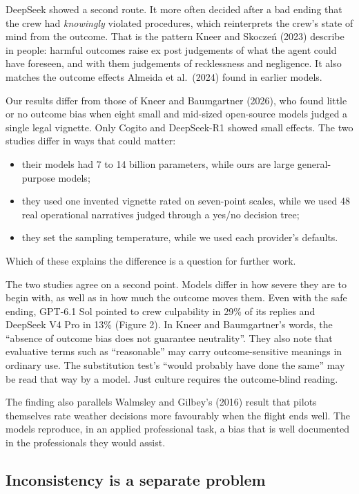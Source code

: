 \documentclass[11pt]{article}
\providecommand{\tightlist}{\setlength{\itemsep}{0pt}\setlength{\parskip}{0pt}}
\begin{document}
DeepSeek showed a second route. It more often decided after a bad ending that the crew had \emph{knowingly} violated procedures, which reinterprets the crew's state of mind from the outcome. That is the pattern Kneer and Skoczeń (2023) describe in people: harmful outcomes raise ex post judgements of what the agent could have foreseen, and with them judgements of recklessness and negligence. It also matches the outcome effects Almeida et al.~(2024) found in earlier models.

Our results differ from those of Kneer and Baumgartner (2026), who found little or no outcome bias when eight small and mid-sized open-source models judged a single legal vignette. Only Cogito and DeepSeek-R1 showed small effects. The two studies differ in ways that could matter:

\begin{itemize}
\tightlist
\item
  their models had 7 to 14 billion parameters, while ours are large general-purpose models;
\item
  they used one invented vignette rated on seven-point scales, while we used 48 real operational narratives judged through a yes/no decision tree;
\item
  they set the sampling temperature, while we used each provider's defaults.
\end{itemize}

Which of these explains the difference is a question for further work.

The two studies agree on a second point. Models differ in how severe they are to begin with, as well as in how much the outcome moves them. Even with the safe ending, GPT-6.1 Sol pointed to crew culpability in 29\% of its replies and DeepSeek V4 Pro in 13\% (Figure 2). In Kneer and Baumgartner's words, the ``absence of outcome bias does not guarantee neutrality''. They also note that evaluative terms such as ``reasonable'' may carry outcome-sensitive meanings in ordinary use. The substitution test's ``would probably have done the same'' may be read that way by a model. Just culture requires the outcome-blind reading.

The finding also parallels Walmsley and Gilbey's (2016) result that pilots themselves rate weather decisions more favourably when the flight ends well. The models reproduce, in an applied professional task, a bias that is well documented in the professionals they would assist.

\hypertarget{inconsistency-is-a-separate-problem}{%
\subsection{Inconsistency is a separate problem}\label{inconsistency-is-a-separate-problem}}
\end{document}
